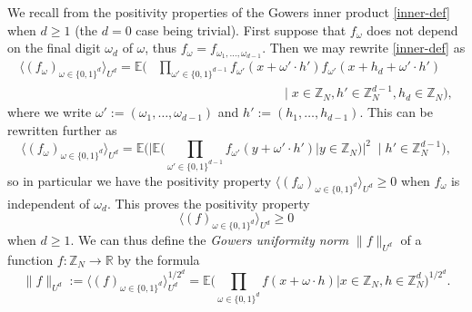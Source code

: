 \documentclass[12pt,a4paper,reqno]{amsart}
\numberwithin{equation}{section}
\theoremstyle{plain}
\theoremstyle{definition}
\renewcommand{\geq}{\geqslant}
\def\E{{\mathbb E}}
\def\R{{\mathbb R}}
\def\ni{\noindent}
\def\emph#1{{\it #1}}
\begin{document}
\ni We recall from \cite{gowers} the positivity properties of the Gowers inner product \eqref{inner-def} when $d \geq 1$ (the $d=0$
case being trivial).  First suppose that $f_\omega$ does not depend on the final digit $\omega_d$ of $\omega$, thus
$f_\omega = f_{\omega_1, \ldots, \omega_{d-1}}$.  Then we may rewrite \eqref{inner-def} as
\begin{align*}
\langle (f_\omega)_{\omega \in \{0,1\}^d} \rangle_{U^d}
= \E\bigg(& \prod_{\omega' \in \{0,1\}^{d-1}}  
f_{\omega'}(x + \omega' \cdot h')
f_{\omega'}(x + h_d + \omega' \cdot h')\\
& \qquad\qquad\qquad\qquad\qquad \bigg| \; x \in \mathbb{Z}_N, h' \in \mathbb{Z}_N^{d-1}, h_d \in \mathbb{Z}_N \bigg),
\end{align*}
where we write $\omega' := (\omega_1, \ldots, \omega_{d-1})$ and $h' := (h_1, \ldots, h_{d-1})$.  This can be
rewritten further as
\begin{equation}\label{f-cube}
\langle (f_\omega)_{\omega \in \{0,1\}^d} \rangle_{U^d}
=
\E\bigg(
\big|\E\big( \prod_{\omega' \in \{0,1\}^{d-1}} f_{\omega'}(y + \omega' \cdot h') | y \in \mathbb{Z}_N\big)\big|^2
 \;\; \bigg| \; h' \in \mathbb{Z}_N^{d-1} \bigg),
\end{equation}
so in particular we have the positivity property
$\langle (f_\omega)_{\omega \in \{0,1\}^d} \rangle_{U^d} \geq 0$
when $f_\omega$ is independent of $\omega_d$.  This proves the positivity property
\begin{equation}\label{positivity}
 \langle (f)_{\omega \in \{0,1\}^d} \rangle_{U^d} \geq 0
\end{equation}
when $d \geq 1$.  We can thus define the \emph{Gowers uniformity norm} $\|f\|_{U^d}$ of a function 
$f: \mathbb{Z}_N \to \R$ by the formula
\begin{equation}\label{ud-def}
 \|f \|_{U^d} := \langle (f)_{\omega \in \{0,1\}^d} \rangle_{U^d}^{1/2^d}
= \E\bigg( \prod_{\omega \in \{0,1\}^d} f(x + \omega \cdot h) \bigg| x \in \mathbb{Z}_N, h \in \mathbb{Z}_N^d \bigg)^{1/2^d}.
\end{equation}
\end{document}
